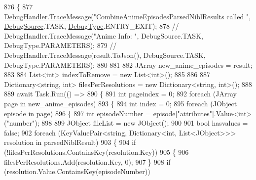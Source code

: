 \begin{DoxyCode}
876         \{
877             \mbox{\hyperlink{class_little_weeb_library_1_1_handlers_1_1_anime_profile_handler_a0b0ae3c3838d26351485e6dfc566a632}{DebugHandler}}.\mbox{\hyperlink{interface_little_weeb_library_1_1_handlers_1_1_i_debug_handler_a2e405bc3492e683cd3702fae125221bc}{TraceMessage}}(\textcolor{stringliteral}{"CombineAnimeEpisodesParsedNiblResults called
      "}, \mbox{\hyperlink{namespace_little_weeb_library_1_1_handlers_a2a6ca0775121c9c503d58aa254d292be}{DebugSource}}.TASK, \mbox{\hyperlink{namespace_little_weeb_library_1_1_handlers_ab66019ed40462876ec4e61bb3ccb0a62}{DebugType}}.ENTRY\_EXIT);
878            \textcolor{comment}{// DebugHandler.TraceMessage("Anime Info: ", DebugSource.TASK, DebugType.PARAMETERS);}
879            \textcolor{comment}{// DebugHandler.TraceMessage(result.ToJson(), DebugSource.TASK, DebugType.PARAMETERS);}
880 
881 
882             JArray new\_anime\_episodes = result;
883 
884             List<int> indexToRemove = \textcolor{keyword}{new} List<int>();
885 
886 
887             Dictionary<string, int> filesPerResolutions = \textcolor{keyword}{new} Dictionary<string, int>();
888 
889             await Task.Run(() =>
890             \{
891                 \textcolor{keywordtype}{int} pageindex = 0;
892                 \textcolor{keywordflow}{foreach} (JArray page \textcolor{keywordflow}{in} new\_anime\_episodes)
893                 \{
894                     \textcolor{keywordtype}{int} index = 0;
895                     \textcolor{keywordflow}{foreach} (JObject episode \textcolor{keywordflow}{in} page)
896                     \{
897                         \textcolor{keywordtype}{int} episodeNumber = episode[\textcolor{stringliteral}{"attributes"}].Value<\textcolor{keywordtype}{int}>(\textcolor{stringliteral}{"number"});
898 
899                         JObject fileList = \textcolor{keyword}{new} JObject();
900 
901                         \textcolor{keywordtype}{bool} hasvalues = \textcolor{keyword}{false};
902                         \textcolor{keywordflow}{foreach} (KeyValuePair<\textcolor{keywordtype}{string}, Dictionary<\textcolor{keywordtype}{int}, List<JObject>>> resolution \textcolor{keywordflow}{in} 
      parsedNiblResult)
903                         \{
904                             \textcolor{keywordflow}{if} (!filesPerResolutions.ContainsKey(resolution.Key))
905                             \{
906                                 filesPerResolutions.Add(resolution.Key, 0);
907                             \}
908                             \textcolor{keywordflow}{if} (resolution.Value.ContainsKey(episodeNumber))

\end{DoxyCode}

